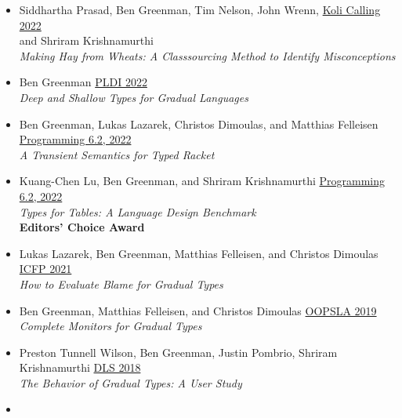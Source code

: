 \documentclass[11pt]{article}
\begin{document}
\begin{itemize}
    \emph{Gradual Soundness: Lessons from Static Python} \hfill {}
\item
  Siddhartha Prasad, Ben Greenman, Tim Nelson, John Wrenn, \hfill \href{https://www.kolicalling.fi/}{Koli Calling 2022} \\
  and Shriram Krishnamurthi \\
    \emph{Making Hay from Wheats: A Classsourcing Method to Identify Misconceptions} \hfill {}
\item
  Ben Greenman \hfill \href{https://pldi22.sigplan.org/}{PLDI 2022} \\
    \emph{Deep and Shallow Types for Gradual Languages} \hfill {}
\item
  Ben Greenman, Lukas Lazarek, Christos Dimoulas, and Matthias Felleisen \hfill \href{https://2022.programming-conference.org/}{Programming 6.2, 2022} \\
    \emph{A Transient Semantics for Typed Racket} \hfill {} %
\item
  Kuang-Chen Lu, Ben Greenman, and Shriram Krishnamurthi \hfill \href{https://2022.programming-conference.org/}{Programming 6.2, 2022} \\
    \emph{Types for Tables: A Language Design Benchmark} \hfill {}
    {\\\textbf{Editors' Choice Award}}
\item
  Lukas Lazarek, Ben Greenman, Matthias Felleisen, and Christos Dimoulas \hfill \href{https://icfp21.sigplan.org/}{ICFP 2021} \\
  \emph{How to Evaluate Blame for Gradual Types} \hfill {} %
\item
  Ben Greenman, Matthias Felleisen, and Christos Dimoulas \hfill \href{https://conf.researchr.org/track/splash-2019/splash-2019-OOPSLA}{OOPSLA 2019} \\
  \emph{Complete Monitors for Gradual Types} \hfill {}
\item
  Preston Tunnell Wilson, Ben Greenman, Justin Pombrio, Shriram Krishnamurthi \hfill \href{https://conf.researchr.org/track/dls-2018/dls-2018}{DLS 2018} \\
  \emph{The Behavior of Gradual Types: A User Study} \hfill {}
\item

\end{itemize}
\end{document}
